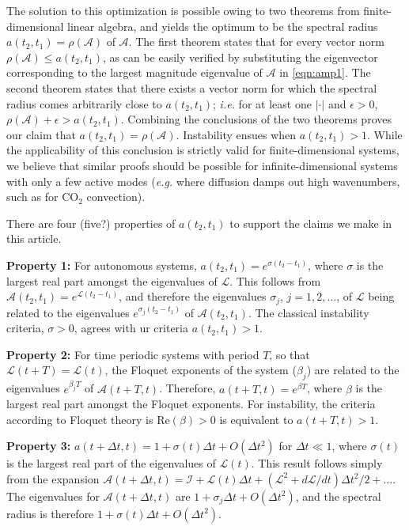 \documentclass[letterpaper,10pt,prl,twocolumn,aps,reprint,superscriptaddress]{revtex4-1}
\newcommand{\cotwo}{CO$_2$ }
\newcommand{\cL}{\boldsymbol{\mathcal{L}}}
\newcommand{\cA}{\boldsymbol{\mathcal{A}}}
\newcommand{\cI}{\boldsymbol{\mathcal{I}}}
\newcommand{\nrm}{{|\cdot|}}
\begin{document}
The solution to this optimization is possible owing to two theorems from finite-dimensional linear algebra, and yields the optimum to be the spectral radius $a(t_2,t_1) = \rho(\cA)$ of $\cA$. 
The first theorem states that for every vector norm $\rho(\cA) \le a(t_2,t_1)$, as can be easily verified by substituting the eigenvector corresponding to the largest magnitude eigenvalue of $\cA$ in \eqref{eqn:amp1}. 
The second theorem states that there exists a vector norm for which the spectral radius comes arbitrarily close to $a(t_2,t_1)$\cite{bulirsch2002introduction}; {\it i.e.} for at least one $\nrm$ and $\epsilon>0$, $\rho (\cA) + \epsilon > a(t_2,t_1)$. 
Combining the conclusions of the two theorems proves our claim that $a(t_2, t_1) = \rho(\cA)$. 
Instability ensues when $a(t_2, t_1) > 1$.
While the applicability of this conclusion is strictly valid for finite-dimensional systems, we believe that similar proofs should be possible for infinite-dimensional systems with only a few active modes ({\it e.g.} where diffusion damps out high wavenumbers, such as for \cotwo convection).

There are four (five?) properties of $a(t_2, t_1)$ to support the claims we make in this article.

{\bf Property 1:} 
For autonomous systems, $a(t_2, t_1) = e^{\sigma (t_2-t_1)}$, where $\sigma$ is the largest real part amongst the eigenvalues of $\cL$.
This follows from $\cA(t_2, t_1) = e^{\cL(t_2-t_1)}$, and therefore the eigenvalues $\sigma_j$, $j=1, 2, \dots$, of $\cL$ being related to the eigenvalues $e^{\sigma_j (t_2-t_1)}$ of $\cA(t_2,t_1)$.
The classical instability criteria, $\sigma > 0$, agrees with ur criteria $a(t_2, t_1)> 1$.

{\bf Property 2:}
For time periodic systems with period $T$, so that $\cL(t+T) = \cL(t)$, the Floquet exponents of the system ($\beta_j$) are related to the eigenvalues $e^{\beta_j T}$ of $\cA(t+T, t)$. 
Therefore, $a(t+T, t) = e^{\beta T}$, where $\beta$ is the largest real part amongst the Floquet exponents. 
For instability, the criteria according to Floquet theory is $\text{Re}(\beta) > 0$ is equivalent to $a(t+T, t) > 1$.

{\bf Property 3:}
$a(t+\Delta t, t) = 1 + \sigma(t) \Delta t + O(\Delta t^2)$ for $\Delta t \ll 1$, where $\sigma(t)$ is the largest real part of the eigenvalues of $\cL(t)$. 
This result follows simply from the expansion $\cA(t+\Delta t, t) = \cI + \cL(t) \Delta t + (\cL^2 + d\cL/dt)\Delta t^2/2 + \dots$.
The eigenvalues for $\cA(t+\Delta t, t)$ are $1 + \sigma_j \Delta t + O(\Delta t^2)$, and the spectral radius is therefore $1 + \sigma(t) \Delta t + O(\Delta t^2).$
\end{document}
